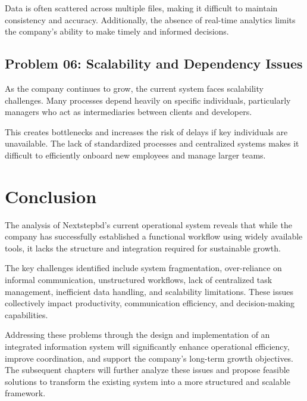 \documentclass[12pt,a4paper]{report}
\begin{document}
Data is often scattered across multiple files, making it difficult to maintain consistency and accuracy. Additionally, the absence of real-time analytics limits the company's ability to make timely and informed decisions.

\subsection{Problem 06: Scalability and Dependency Issues}

As the company continues to grow, the current system faces scalability challenges. Many processes depend heavily on specific individuals, particularly managers who act as intermediaries between clients and developers.

This creates bottlenecks and increases the risk of delays if key individuals are unavailable. The lack of standardized processes and centralized systems makes it difficult to efficiently onboard new employees and manage larger teams.

\section{Conclusion}

The analysis of Nextstepbd's current operational system reveals that while the company has successfully established a functional workflow using widely available tools, it lacks the structure and integration required for sustainable growth.

The key challenges identified include system fragmentation, over-reliance on informal communication, unstructured workflows, lack of centralized task management, inefficient data handling, and scalability limitations. These issues collectively impact productivity, communication efficiency, and decision-making capabilities.

Addressing these problems through the design and implementation of an integrated information system will significantly enhance operational efficiency, improve coordination, and support the company's long-term growth objectives. The subsequent chapters will further analyze these issues and propose feasible solutions to transform the existing system into a more structured and scalable framework.
\end{document}
